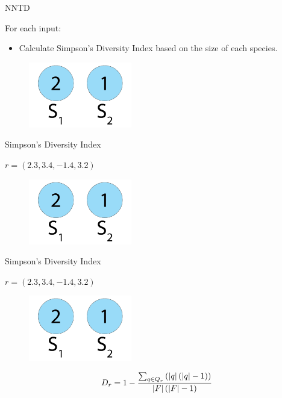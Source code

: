 \begin{frame}{NNTD}
\begin{center}
For each input:
  \begin{itemize}
	  \item Calculate Simpson's Diversity Index based on the size of each species.
  \end{itemize}
     \begin{figure}[p]
  \includegraphics[width=0.4\textwidth]{images/speciessize.png}
  \end{figure}
\end{center}
\end{frame}

\begin{frame}{Simpson's Diversity Index}
\begin{center}
$r = (2.3, 3.4, -1.4, 3.2)$
  \begin{figure}[p]
  \includegraphics[width=0.4\textwidth]{images/speciessize.png}
  \end{figure}
\end{center}
\end{frame}

\begin{frame}{Simpson's Diversity Index}
\begin{center}
$r = (2.3, 3.4, -1.4, 3.2)$
  \begin{figure}[p]
  \includegraphics[width=0.4\textwidth]{images/speciessize.png}
  \end{figure}
\begin{equation}
D_r = 1 - \frac{\sum_{q \in Q_{r}}\left(\lvert q\rvert\left(\lvert q\rvert - 1\right)\right)}{\lvert F\rvert\left(\lvert F\rvert - 1\right)}
\end{equation}
\end{center}
\end{frame}

